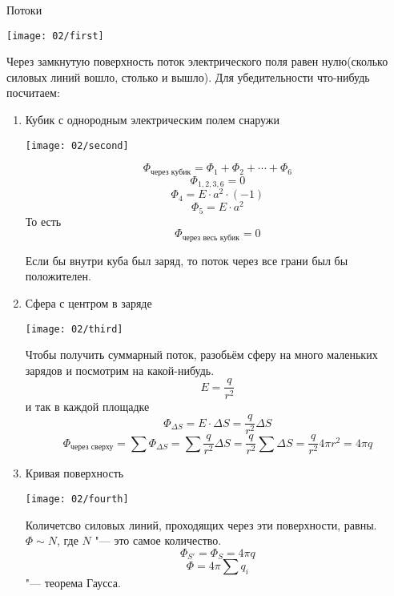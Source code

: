 \begin{section}{Потоки}

	\begin{center}
	\texttt{[image: 02/first]}
	\end{center}

Через замкнутую поверхность поток электрического поля равен нулю(сколько силовых линий вошло, столько и вышло). 
Для убедительности что-нибудь посчитаем:
\begin{enumerate}

\item Кубик с однородным электрическим полем снаружи

	\begin{center}
	\texttt{[image: 02/second]}
	\end{center}

	\[\Phi_{\text{через кубик}} = \Phi_1 + \Phi_2 + \cdots + \Phi_6\]
	\[\Phi_{1, 2, 3, 6} = 0\]
	\[\Phi_4 = E \cdot a^2 \cdot (-1)\]
	\[\Phi_5 = E \cdot a^2\]
	То есть
	\[\Phi_{\text{через весь кубик}} = 0\]
	\begin{Rem}
	Если бы внутри куба был заряд, то поток через все грани был бы положителен.
	\end{Rem}
	
\item Сфера с центром в заряде

	\begin{center}
	\texttt{[image: 02/third]}
	\end{center}

	Чтобы получить суммарный поток, разобьём сферу на много маленьких зарядов и посмотрим на какой-нибудь.
	\[E = \frac{q}{r^2}\]
	и так в каждой площадке
	\[\Phi_{\Delta S} = E \cdot \Delta S = \frac{q}{r^2}\Delta S\]
	\[\Phi_{\text{через сверху}} = \sum \Phi_{\Delta S} = \sum \frac{q}{r^2}\Delta S = \frac{q}{r^2}\sum\Delta S 
	= \frac{q}{r^2}4\pi r^2 = 4 \pi q\]
	
\item Кривая поверхность
	
	\begin{center}
	\texttt{[image: 02/fourth]}
	\end{center}

	Количетсво силовых линий, проходящих через эти поверхности, равны. $\Phi \sim N$, где $N$ "--- это самое количество.
	\[\Phi_{S'} = \Phi_S = 4\pi q\]
	\[\Phi = 4\pi\sum q_i\] "--- теорема Гаусса.


\end{enumerate}
\end{section}
